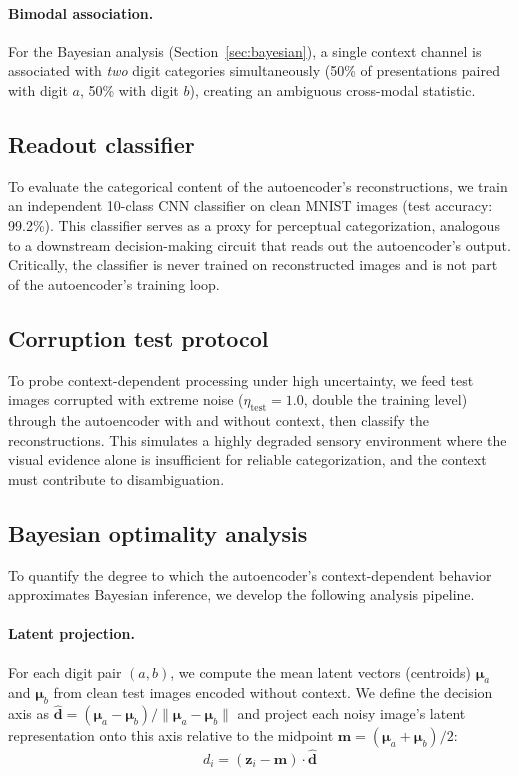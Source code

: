 \documentclass[11pt,a4paper]{article}
\begin{document}
\paragraph{Bimodal association.}
For the Bayesian analysis (Section~\ref{sec:bayesian}), a single context channel is associated with \emph{two} digit categories simultaneously (50\% of presentations paired with digit $a$, 50\% with digit $b$), creating an ambiguous cross-modal statistic.

\subsection{Readout classifier}

To evaluate the categorical content of the autoencoder's reconstructions, we train an independent 10-class CNN classifier on clean MNIST images (test accuracy: 99.2\%).
This classifier serves as a proxy for perceptual categorization, analogous to a downstream decision-making circuit that reads out the autoencoder's output.
Critically, the classifier is never trained on reconstructed images and is not part of the autoencoder's training loop.

\subsection{Corruption test protocol}
\label{sec:corruption_protocol}

To probe context-dependent processing under high uncertainty, we feed test images corrupted with extreme noise ($\eta_\text{test} = 1.0$, double the training level) through the autoencoder with and without context, then classify the reconstructions.
This simulates a highly degraded sensory environment where the visual evidence alone is insufficient for reliable categorization, and the context must contribute to disambiguation.

\subsection{Bayesian optimality analysis}
\label{sec:bayesian_methods}

To quantify the degree to which the autoencoder's context-dependent behavior approximates Bayesian inference, we develop the following analysis pipeline.

\paragraph{Latent projection.}
For each digit pair $(a, b)$, we compute the mean latent vectors (centroids) $\boldsymbol{\mu}_a$ and $\boldsymbol{\mu}_b$ from clean test images encoded without context.
We define the decision axis as $\hat{\mathbf{d}} = (\boldsymbol{\mu}_a - \boldsymbol{\mu}_b) / \|\boldsymbol{\mu}_a - \boldsymbol{\mu}_b\|$ and project each noisy image's latent representation onto this axis relative to the midpoint $\mathbf{m} = (\boldsymbol{\mu}_a + \boldsymbol{\mu}_b)/2$:
\begin{equation}
    d_i = (\mathbf{z}_i - \mathbf{m}) \cdot \hat{\mathbf{d}}
\end{equation}
\end{document}
